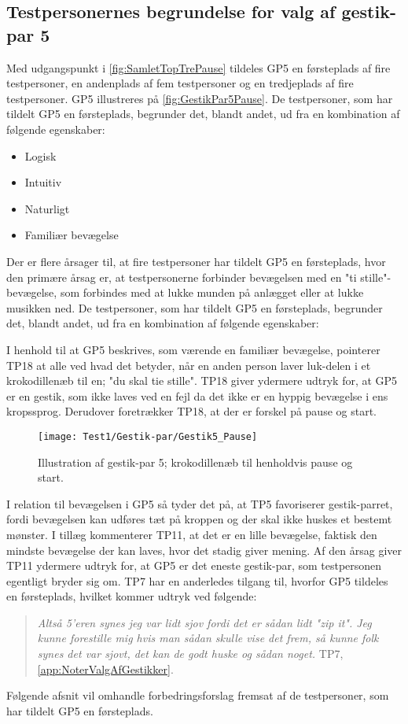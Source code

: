 \subsection{Testpersonernes begrundelse for valg af gestik-par 5}
\label{TestresultaterValgAfGestikkerBegrundelseGP5}
%
Med udgangspunkt i \autoref{fig:SamletTopTrePause} tildeles GP5 en førsteplads af fire testpersoner, en andenplads af fem testpersoner og en tredjeplads af fire testpersoner. GP5 illustreres på \autoref{fig:GestikPar5Pause}. De testpersoner, som har tildelt GP5 en førsteplads, begrunder det, blandt andet, ud fra en kombination af følgende egenskaber: 
%
\begin{multicols}{3}
    \begin{itemize}
        \item Logisk
        \item Intuitiv
        \item Naturligt
        \item Familiær bevægelse
\end{itemize}
\end{multicols}
\noindent
%
Der er flere årsager til, at fire testpersoner har tildelt GP5 en førsteplads, hvor den primære årsag er, at testpersonerne forbinder bevægelsen med en "ti stille"-bevægelse, som forbindes med at lukke munden på anlægget eller at lukke musikken ned. De testpersoner, som har tildelt GP5 en førsteplads, begrunder det, blandt andet, ud fra en kombination af følgende egenskaber: 

I henhold til at GP5 beskrives, som værende en familiær bevægelse, pointerer TP18 at alle ved hvad det betyder, når en anden person laver luk-delen i et krokodillenæb til en; "du skal tie stille". TP18 giver ydermere udtryk for, at GP5 er en gestik, som ikke laves ved en fejl da det ikke er en hyppig bevægelse i ens kropssprog. Derudover foretrækker TP18, at der er forskel på pause og start. 
%
\begin{figure}[H]
	\centering
	\texttt{[image: Test1/Gestik-par/Gestik5\_Pause]}
	\caption{Illustration af gestik-par 5; krokodillenæb til henholdvis pause og start.}
	\label{fig:GestikPar5Pause}
\end{figure}
\noindent
%
I relation til bevægelsen i GP5 så tyder det på, at TP5 favoriserer gestik-parret, fordi bevægelsen kan udføres tæt på kroppen og der skal ikke huskes et bestemt mønster. I tillæg kommenterer TP11, at det er en lille bevægelse, faktisk den mindste bevægelse der kan laves, hvor det stadig giver mening. Af den årsag giver TP11 ydermere udtryk for, at GP5 er det eneste gestik-par, som testpersonen egentligt bryder sig om. TP7 har en anderledes tilgang til, hvorfor GP5 tildeles en førsteplads, hvilket kommer udtryk ved følgende: 
%
\begin{quotation}
	\noindent
	\textit{Altså 5'eren synes jeg var lidt sjov fordi det er sådan lidt "zip it". Jeg kunne forestille mig hvis man sådan skulle vise det frem, så kunne folk synes det var sjovt, det kan de godt huske og sådan noget.} TP7, \autoref{app:NoterValgAfGestikker}.
\noindent
\end{quotation}
%
Følgende afsnit vil omhandle forbedringsforslag fremsat af de testpersoner, som har tildelt GP5 en førsteplads.
%
